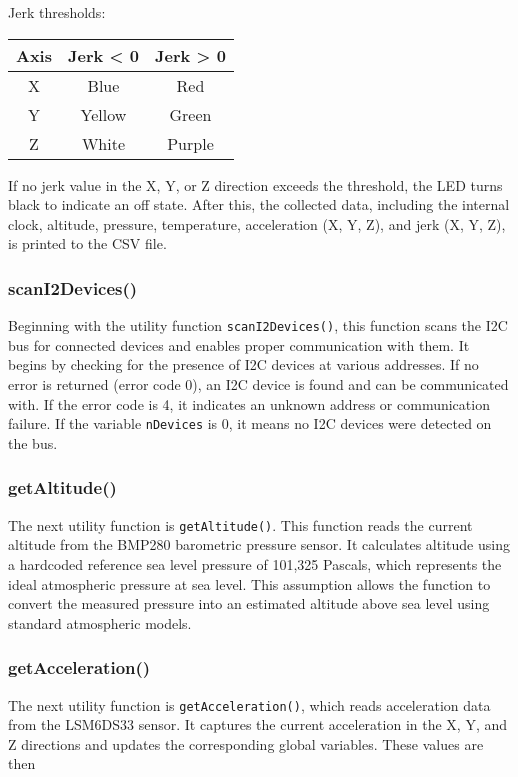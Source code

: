 \documentclass[12pt]{report}
\begin{document}
Jerk thresholds:
\begin{center}
\begin{tabular}{|c|c|c|}
\hline
\textbf{Axis} & \textbf{Jerk < 0} & \textbf{Jerk > 0} \\
\hline
X & Blue & Red \\
Y & Yellow & Green \\
Z & White & Purple \\
\hline
\end{tabular}
\end{center}

If no jerk value in the X, Y, or Z direction exceeds the threshold, the LED turns black to indicate an off state. After this, the collected data, including the internal clock, altitude, pressure, temperature, acceleration (X, Y, Z), and jerk (X, Y, Z), is printed to the CSV file.




\subsubsection*{scanI2Devices()}
Beginning with the utility function \texttt{scanI2Devices()}, this function scans the I2C bus for connected devices and enables proper communication with them. It begins by checking for the presence of I2C devices at various addresses. If no error is returned (error code 0), an I2C device is found and can be communicated with. If the error code is 4, it indicates an unknown address or communication failure. If the variable \texttt{nDevices} is 0, it means no I2C devices were detected on the bus.


\subsubsection*{getAltitude()}
The next utility function is \texttt{getAltitude()}. This function reads the current altitude from the BMP280 barometric pressure sensor. It calculates altitude using a hardcoded reference sea level pressure of 101{,}325 Pascals, which represents the ideal atmospheric pressure at sea level. This assumption allows the function to convert the measured pressure into an estimated altitude above sea level using standard atmospheric models.


\subsubsection*{getAcceleration()}
The next utility function is \texttt{getAcceleration()}, which reads acceleration data from the LSM6DS33 sensor. It captures the current acceleration in the X, Y, and Z directions and updates the corresponding global variables. These values are then
\end{document}
